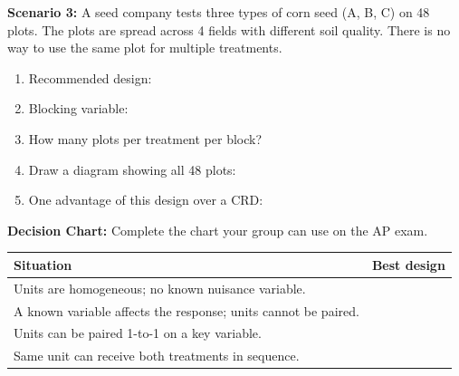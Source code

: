 \documentclass[10pt]{article}
\begin{document}
\vspace{0.1in}

\textbf{Scenario 3:} A seed company tests three types of corn seed (A, B, C) on
48 plots. The plots are spread across 4 fields with different soil quality.
There is no way to use the same plot for multiple treatments.

\begin{practicebox}
\small
\begin{enumerate}[leftmargin=1.5em, itemsep=8pt]
  \item Recommended design: \blank{6cm}
  \item Blocking variable: \blank{6cm}
  \item How many plots per treatment per block? \blank{3cm}
  \item Draw a diagram showing all 48 plots:
  \vspace{1.4in}
  \item One advantage of this design over a CRD: \blank{9cm}
\end{enumerate}
\end{practicebox}

\vspace{0.12in}

\begin{practicebox}
\small
\textbf{Decision Chart:} Complete the chart your group can use on the AP exam.

\vspace{4pt}
\renewcommand{\arraystretch}{1.8}
\begin{tabularx}{\linewidth}{@{} X c @{}}
\textbf{Situation} & \textbf{Best design} \\
\hline
Units are homogeneous; no known nuisance variable. & \\
A known variable affects the response; units cannot be paired. & \\
Units can be paired 1-to-1 on a key variable. & \\
Same unit can receive both treatments in sequence. & \\
\end{tabularx}
\end{practicebox}
\end{document}
